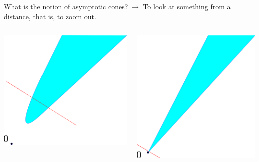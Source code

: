 \documentclass[aspectratio=169, dvipdfmx, 11pt]{beamer}
\begin{document}
\begin{frame}{What is the notion of asymptotic cones?}
  \pause
  $\rightarrow$ To look at something from a distance, that is, to zoom out.

  \medskip

  \centering
    \begin{columns}
      \pause
      \begin{column}{0.48\textwidth}
      \centering
      \includegraphics[keepaspectratio, scale=0.095]{figures/asymptotic_meaning_1.eps}
      \end{column}
      \pause
      \begin{column}{0.48\textwidth}
      \centering
      \includegraphics[keepaspectratio, scale=0.095]{figures/asymptotic_meaning_2.eps}
    \end{column}
  \end{columns}
\end{frame}
\end{document}
